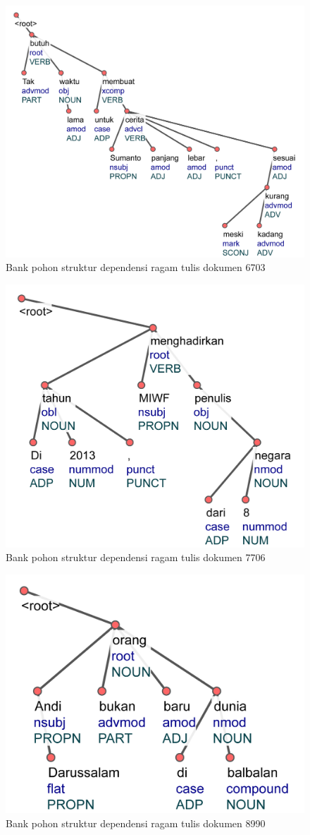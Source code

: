\begin{figure}
	\centering \includegraphics[width=0.7
	\textwidth] {pics/lampiran/lampirants6703.jpg} 
	\caption{Bank pohon struktur dependensi ragam tulis dokumen 6703} 
	\label{fig:lampirants6703} 
\end{figure}

\begin{figure}
	\centering \includegraphics[width=0.45
	\textwidth] {pics/lampiran/lampirants7706.jpg} 
	\caption{Bank pohon struktur dependensi ragam tulis dokumen 7706} 
	\label{fig:lampirants7706} 
\end{figure}


\begin{figure}
	\centering \includegraphics[width=0.4
	\textwidth] {pics/lampiran/lampirants8990.jpg} 
	\caption{Bank pohon struktur dependensi ragam tulis dokumen 8990} 
	\label{fig:lampirants8990} 
\end{figure}

